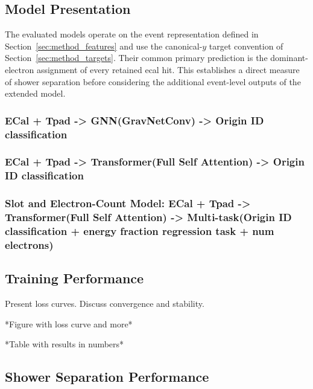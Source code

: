 
\subsection{Model Presentation}
\label{sec:results_model_presentation}

The evaluated models operate on the event representation defined in
Section~\ref{sec:method_features} and use the canonical-\(y\) target
convention of Section~\ref{sec:method_targets}. Their common primary
prediction is the dominant-electron assignment of every retained
\gls{ecal} hit. This establishes a direct measure of shower separation before
considering the additional event-level outputs of the extended model.


\subsubsection{ECal + Tpad -> GNN(GravNetConv) -> Origin ID classification}


\subsubsection{ECal + Tpad -> Transformer(Full Self Attention) -> Origin ID classification}






\subsubsection{Slot and Electron-Count Model: ECal + Tpad -> Transformer(Full Self Attention) -> Multi-task(Origin ID classification + energy fraction regression task + num electrons)}



\subsection{Training Performance}
Present loss curves.
Discuss convergence and stability.

*Figure with loss curve and more*

*Table with results in numbers*

\subsection{Shower Separation Performance}

